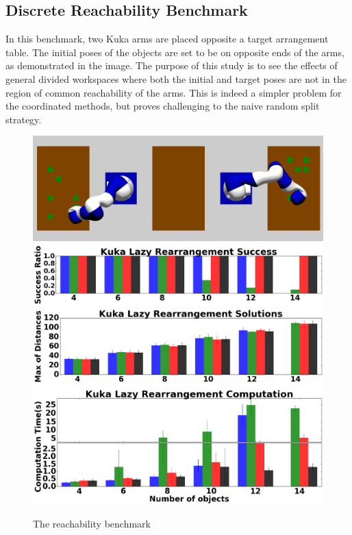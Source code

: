 \subsection{Discrete Reachability Benchmark}
In this benchmark, two Kuka arms are placed opposite a target arrangement table. The initial poses of the objects are set to be on opposite ends of the arms, as demonstrated in the image. The purpose of this study is to see the effects of general divided workspaces where both the initial and target poses are not in the region of common reachability of the arms. This is indeed a simpler problem for the coordinated methods, but proves challenging to the naive random split strategy. 

\begin{figure}
	\centering
	\includegraphics[width=5.3in]{figures/reachability}
	\includegraphics[width=5.3in]{figures/results/5_kuka_lazy_ms_success.png}
	\includegraphics[width=5.3in]{figures/results/5_kuka_lazy_ms_cost.png}
	\includegraphics[width=5.3in]{figures/results/5_kuka_lazy_ms_time.png}
	\caption{The reachability benchmark}
	\label{fig:reachability_benchmark}
\end{figure}



